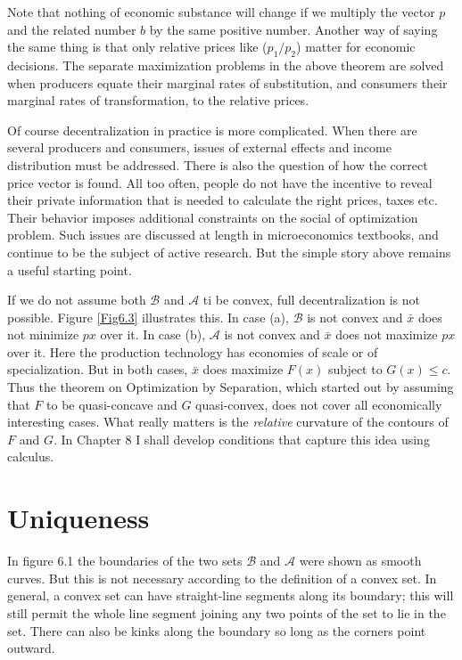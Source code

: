 Note that nothing of economic substance will change if we multiply the vector $p$ and the related number $b$ by the same positive number. Another way of saying the same thing is that only relative prices like ($p_1/ p_2$) matter for economic decisions. The separate maximization problems in the above theorem are solved when producers equate their marginal rates of substitution, and consumers their marginal rates of transformation, to the relative prices.

Of course decentralization in practice is more complicated. When there are several producers and consumers, issues of external effects and income distribution must be addressed. There is also the question of how the correct price vector is found. All too often, people do not have the incentive to reveal their private information that is needed to calculate the right prices, taxes etc. Their behavior imposes additional constraints on the social of optimization problem. Such issues are discussed at length in microeconomics textbooks, and continue to be the subject of active research. But the simple story above remains a useful starting point.

If we do not assume both $\mathcal{B}$ and $\mathcal{A}$ ti be convex, full decentralization is not possible. Figure \ref{Fig6.3} illustrates this. In case (a), $\mathcal{B}$ is not convex and $\bar{x}$ does not minimize $px$ over it. In case (b), $\mathcal{A}$ is not convex and $\bar{x}$ does not maximize $px$ over it. Here the production technology has economies of scale or of specialization. But in both cases, $\bar{x}$ does maximize $F(x)$ subject to $G(x) \leq c$. Thus the theorem on Optimization by Separation, which started out by assuming that $F$ to be quasi-concave and $G$ quasi-convex, does not cover all economically interesting cases. What really matters is the \textit{relative} curvature of the contours of $F$ and $G$. In Chapter 8 I shall develop conditions that capture this idea using calculus.

\section*{Uniqueness}

In figure 6.1 the boundaries of the two sets $\mathcal{B}$ and $\mathcal{A}$ were shown as smooth curves. But this is not necessary according to the definition of a convex set. In general, a convex set can have straight-line segments along its boundary; this will still permit the whole line segment joining any two points of the set to lie in the set. There can also be kinks along the boundary so long as the corners point outward.

